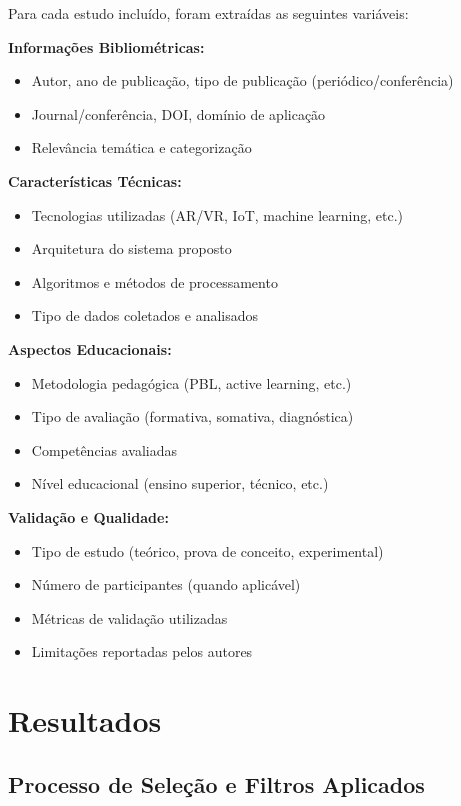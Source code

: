 \documentclass[english, spanish, brazilian]{RBIEarticle} %
\begin{document}
Para cada estudo incluído, foram extraídas as seguintes variáveis:

\textbf{Informações Bibliométricas:}
\begin{itemize}
    \item Autor, ano de publicação, tipo de publicação (periódico/conferência)
    \item Journal/conferência, DOI, domínio de aplicação
    \item Relevância temática e categorização
\end{itemize}

\textbf{Características Técnicas:}
\begin{itemize}
    \item Tecnologias utilizadas (AR/VR, IoT, machine learning, etc.)
    \item Arquitetura do sistema proposto
    \item Algoritmos e métodos de processamento
    \item Tipo de dados coletados e analisados
\end{itemize}

\textbf{Aspectos Educacionais:}
\begin{itemize}
    \item Metodologia pedagógica (PBL, active learning, etc.)
    \item Tipo de avaliação (formativa, somativa, diagnóstica)
    \item Competências avaliadas
    \item Nível educacional (ensino superior, técnico, etc.)
\end{itemize}

\textbf{Validação e Qualidade:}
\begin{itemize}
    \item Tipo de estudo (teórico, prova de conceito, experimental)
    \item Número de participantes (quando aplicável)
    \item Métricas de validação utilizadas
    \item Limitações reportadas pelos autores
\end{itemize}



\section{Resultados}

\subsection{Processo de Seleção e Filtros Aplicados}
\end{document}
